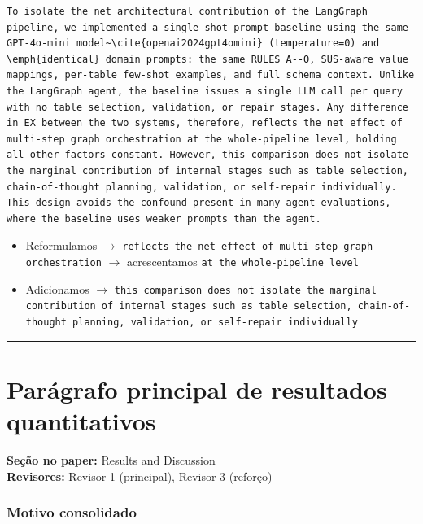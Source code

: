 \documentclass[11pt,a4paper]{article}
\begin{document}
\begin{finalblock}
\begin{lstlisting}[style=texsnippet]
To isolate the net architectural contribution of the LangGraph pipeline, we implemented a single-shot prompt baseline using the same GPT-4o-mini model~\cite{openai2024gpt4omini} (temperature=0) and \emph{identical} domain prompts: the same RULES A--O, SUS-aware value mappings, per-table few-shot examples, and full schema context. Unlike the LangGraph agent, the baseline issues a single LLM call per query with no table selection, validation, or repair stages. Any difference in EX between the two systems, therefore, reflects the net effect of multi-step graph orchestration at the whole-pipeline level, holding all other factors constant. However, this comparison does not isolate the marginal contribution of internal stages such as table selection, chain-of-thought planning, validation, or self-repair individually. This design avoids the confound present in many agent evaluations, where the baseline uses weaker prompts than the agent.
\end{lstlisting}
\end{finalblock}

\begin{trackblock}
\begin{itemize}
  \item Reformulamos $\to$ \texttt{reflects the net effect of multi-step graph orchestration} $\to$ acrescentamos \texttt{at the whole-pipeline level}
  \item Adicionamos $\to$ \texttt{this comparison does not isolate the marginal contribution of internal stages such as table selection, chain-of-thought planning, validation, or self-repair individually}
\end{itemize}
\end{trackblock}

\bigskip\hrule\bigskip

\section{Parágrafo principal de resultados quantitativos}

\textbf{Seção no paper:} Results and Discussion\\
\textbf{Revisores:} Revisor 1 (principal), Revisor 3 (reforço)

\subsubsection*{Motivo consolidado}
\end{document}
